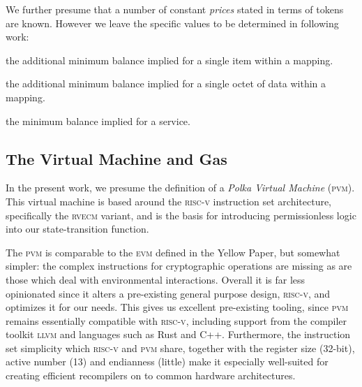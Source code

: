 We further presume that a number of constant \emph{prices} stated in terms of tokens are known. However we leave the specific values to be determined in following work:

\begin{description}\label{eq:prices}
  \item[$\mathsf{B}_I$] the additional minimum balance implied for a single item within a mapping.
  \item[$\mathsf{B}_L$] the additional minimum balance implied for a single octet of data within a mapping.
  \item[$\mathsf{B}_S$] the minimum balance implied for a service.
\end{description}




















\subsection{The Virtual Machine and Gas}\label{sec:virtualmachineandgas}

In the present work, we presume the definition of a \emph{Polka Virtual Machine} (\textsc{pvm}). This virtual machine is based around the \textsc{risc-v} instruction set architecture, specifically the \textsc{rv}\textsc{ecm} variant, and is the basis for introducing permissionless logic into our state-transition function.

The \textsc{pvm} is comparable to the \textsc{evm} defined in the Yellow Paper, but somewhat simpler: the complex instructions for cryptographic operations are missing as are those which deal with environmental interactions. Overall it is far less opinionated since it alters a pre-existing general purpose design, \textsc{risc-v}, and optimizes it for our needs. This gives us excellent pre-existing tooling, since \textsc{pvm} remains essentially compatible with \textsc{risc-v}, including support from the compiler toolkit \textsc{llvm} and languages such as Rust and C++. Furthermore, the instruction set simplicity which \textsc{risc-v} and \textsc{pvm} share, together with the register size (32-bit), active number (13) and endianness (little) make it especially well-suited for creating efficient recompilers on to common hardware architectures.

